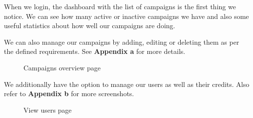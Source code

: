 When we login, the dashboard with the list of campaigns is the first thing we notice. We can see how many active or inactive campaigns we have and also some useful statistics about how well our campaigns are doing.

We can also manage our campaigns by adding, editing or deleting them as per the defined requirements.
See \textbf{Appendix a} for more details.
\begin{figure}[H]
    \centering
    \caption{Campaigns overview page}
    \label{fig:campaigns-overview}
\end{figure}

We additionally have the option to manage our users as well as their credits.
Also refer to \textbf{Appendix b} for more screenshots.
\begin{figure}[H]
    \centering
    \caption{View users page}
    \label{fig:users-view-page}
\end{figure}

